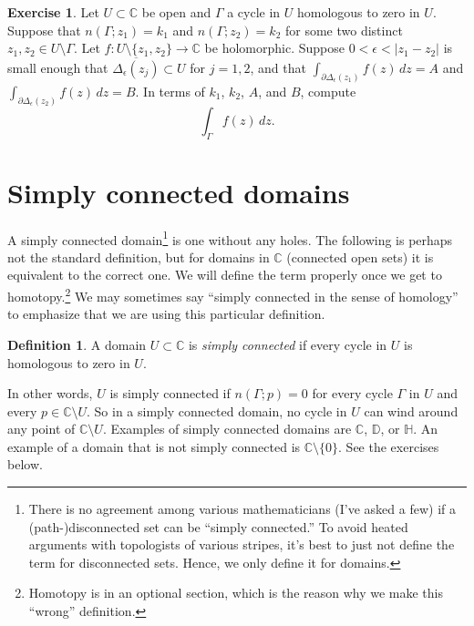 \documentclass[12pt,openany]{book}
\newcommand{\sabs}[1]{\lvert {#1} \rvert}
\newcommand{\C}{{\mathbb{C}}}
\newcommand{\D}{{\mathbb{D}}}
\newcommand{\bH}{{\mathbb{H}}}
\newcommand{\myindex}[1]{#1\index{#1}}
\newcommand{\myquote}[1]{``#1''}
\theoremstyle{plain}
\theoremstyle{remark}
\theoremstyle{definition}
\newtheorem{defn}[thm]{Definition}
\newenvironment{exbox}{%
    \def\FrameCommand{\vrule width 1pt \relax\hspace{10pt}}%
    \MakeFramed{\advance\hsize-\width\FrameRestore}%
}{%
    \endMakeFramed
}
\theoremstyle{exercise}
\newtheorem{exercise}{Exercise}[section]
\theoremstyle{example}
\begin{document}
\begin{exbox}
\begin{exercise}
Let $U \subset \C$ be open and $\Gamma$ a cycle in $U$
homologous to zero in $U$.
Suppose that $n(\Gamma;z_1) = k_1$ and  $n(\Gamma;z_2) = k_2$ for
some two distinct $z_1,z_2 \in U \setminus \Gamma$.
Let $f \colon U \setminus \{z_1,z_2\} \to \C$ be
holomorphic.
Suppose $0< \epsilon < \sabs{z_1-z_2}$ is small enough that
$\overline{\Delta_\epsilon(z_j)} \subset U$ for $j=1,2$,
and that
$\int_{\partial \Delta_\epsilon(z_1)} f(z) \, dz = A$ and 
$\int_{\partial \Delta_\epsilon(z_2)} f(z) \, dz = B$.
In terms of $k_1$, $k_2$, $A$, and $B$,
compute
\begin{equation*}
\int_{\Gamma} f(z) \, dz .
\end{equation*}
\end{exercise}
\end{exbox}



\section{Simply connected domains}

A simply connected domain\footnote{%
There is no agreement among various mathematicians (I've asked a few) if
a (path-)disconnected set can be \myquote{simply connected.}
To avoid heated arguments with topologists of various stripes,
it's best to just not define the term for disconnected sets.
Hence, we only define it for domains.}
is one without any holes.  The following is
perhaps not the standard definition, but for domains in $\C$
(connected open sets)
it is equivalent to the correct one.
We will define the term properly once we get 
to homotopy.\footnote{Homotopy is in an optional section, which is the
reason why we make this \myquote{wrong} definition.}
We may sometimes say
\myquote{simply connected in the sense of homology}
to emphasize that we are using this particular definition.

\begin{defn} \label{defn:simplyconnected:homology}
A domain $U \subset \C$ is \emph{\myindex{simply connected}}
if every cycle in $U$
is homologous to zero in $U$.
\end{defn}

In other words, $U$ is simply connected
if $n(\Gamma;p) = 0$ for every cycle $\Gamma$ in $U$ and
every $p \in \C \setminus U$.
So in a simply connected domain, no cycle in $U$ can wind around any point
of $\C \setminus U$.  Examples of simply connected domains are $\C$, $\D$, or
$\bH$.  An example of a domain that is not simply connected is
$\C \setminus \{ 0 \}$.
See the exercises below.
\end{document}
